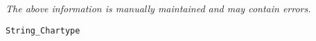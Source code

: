\label{pkg:string\_chartype}

{\tiny \it The above information is manually maintained and may contain errors.}
\begin{verbatim}
String_Chartype
\end{verbatim}
